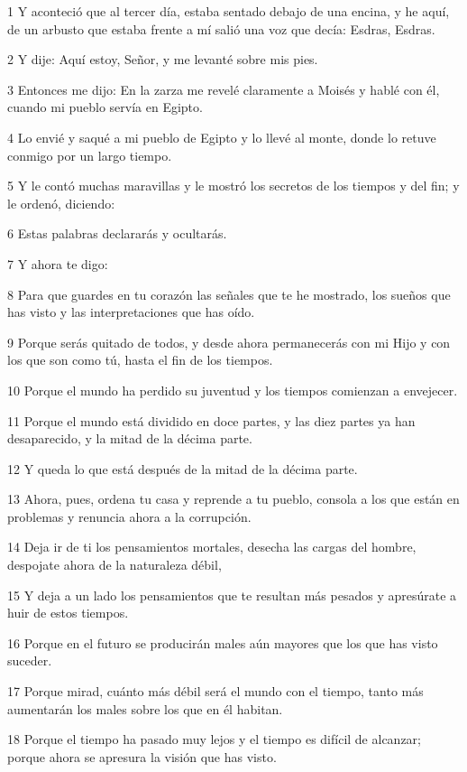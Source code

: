 \par 1 Y aconteció que al tercer día, estaba sentado debajo de una encina, y he aquí, de un arbusto que estaba frente a mí salió una voz que decía: Esdras, Esdras.
\par 2 Y dije: Aquí estoy, Señor, y me levanté sobre mis pies.
\par 3 Entonces me dijo: En la zarza me revelé claramente a Moisés y hablé con él, cuando mi pueblo servía en Egipto.
\par 4 Lo envié y saqué a mi pueblo de Egipto y lo llevé al monte, donde lo retuve conmigo por un largo tiempo.
\par 5 Y le contó muchas maravillas y le mostró los secretos de los tiempos y del fin; y le ordenó, diciendo:
\par 6 Estas palabras declararás y ocultarás.
\par 7 Y ahora te digo:
\par 8 Para que guardes en tu corazón las señales que te he mostrado, los sueños que has visto y las interpretaciones que has oído.
\par 9 Porque serás quitado de todos, y desde ahora permanecerás con mi Hijo y con los que son como tú, hasta el fin de los tiempos.
\par 10 Porque el mundo ha perdido su juventud y los tiempos comienzan a envejecer.
\par 11 Porque el mundo está dividido en doce partes, y las diez partes ya han desaparecido, y la mitad de la décima parte.
\par 12 Y queda lo que está después de la mitad de la décima parte.
\par 13 Ahora, pues, ordena tu casa y reprende a tu pueblo, consola a los que están en problemas y renuncia ahora a la corrupción.
\par 14 Deja ir de ti los pensamientos mortales, desecha las cargas del hombre, despojate ahora de la naturaleza débil,
\par 15 Y deja a un lado los pensamientos que te resultan más pesados ​​y apresúrate a huir de estos tiempos.
\par 16 Porque en el futuro se producirán males aún mayores que los que has visto suceder.
\par 17 Porque mirad, cuánto más débil será el mundo con el tiempo, tanto más aumentarán los males sobre los que en él habitan.
\par 18 Porque el tiempo ha pasado muy lejos y el tiempo es difícil de alcanzar; porque ahora se apresura la visión que has visto.
